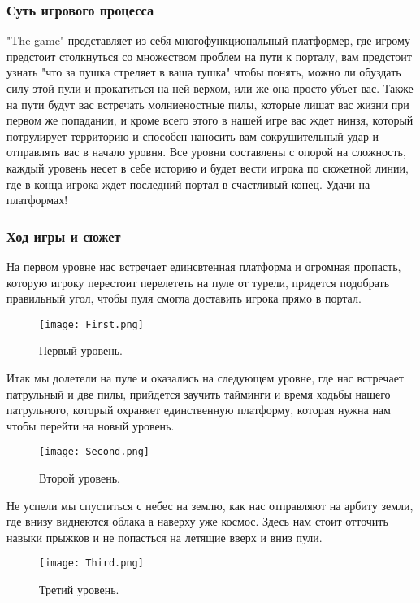 \documentclass[a4paper,12pt]{article}
\begin{document}
\subsubsection{Суть игрового процесса}
"The game" представляет из себя многофункциональный платформер, где игрому предстоит столкнуться со множеством проблем на пути к порталу, вам предстоит узнать "что за пушка стреляет в ваша тушка" чтобы понять, можно ли обуздать силу этой пули и прокатиться на ней верхом, или же она просто убъет вас. Также на пути будут вас встречать молниеностные пилы, которые лишат вас жизни при первом же попадании, и кроме всего этого в нашей игре вас ждет нинзя, который потрулирует территорию и способен наносить вам сокрушительный удар и отправлять вас в начало уровня. Все уровни составлены с опорой на сложность, каждый уровень несет в себе историю и будет вести игрока по сюжетной линии, где в конца игрока ждет последний портал в счастливый конец. Удачи на платформах!

\subsubsection{Ход игры и сюжет}
На первом уровне нас встречает единсвтенная платформа и огромная пропасть, которую игроку перестоит перелететь на пуле от турели, придется подобрать правильный угол, чтобы пуля смогла доставить игрока прямо в портал.

\begin{figure}[H] 
    \centering
    \texttt{[image: First.png]} 
    \caption{Первый уровень.}
    \label{fig:player_character}
\end{figure}

Итак мы долетели на пуле и оказались на следующем уровне, где нас встречает патрульный и две пилы, прийдется заучить тайминги и время ходьбы нашего патрульного, который охраняет единственную платформу, которая нужна нам чтобы перейти на новый уровень.

\begin{figure}[H] 
    \centering
    \texttt{[image: Second.png]} 
    \caption{Второй уровень.}
    \label{fig:player_character}
\end{figure}

Не успели мы спуститься с небес на землю, как нас отправляют на арбиту земли, где внизу виднеются облака а наверху уже космос. Здесь нам стоит отточить навыки прыжков и не попасться на летящие вверх и вниз пули.

\begin{figure}[H] 
    \centering
    \texttt{[image: Third.png]} 
    \caption{Третий уровень.}
    \label{fig:player_character}
\end{figure}
\end{document}
